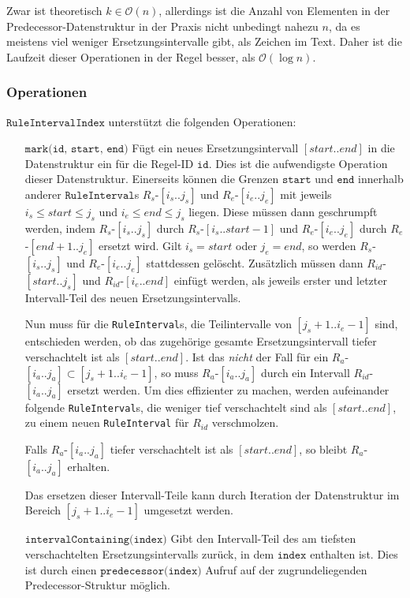 Zwar ist theoretisch $k \in \mathcal{O}(n)$, allerdings ist die Anzahl von Elementen in der Predecessor-Datenstruktur in der Praxis nicht unbedingt nahezu $n$, da es meistens viel weniger Ersetzungsintervalle gibt, als Zeichen im Text. Daher ist die Laufzeit dieser Operationen in der Regel besser, als $\mathcal{O}(\log n)$.

\subsubsection{Operationen}

$\texttt{RuleIntervalIndex}$ unterstützt die folgenden Operationen:

\begin{itemize}[leftmargin=5cm]
	\item[$\texttt{mark(id, start, end)}$] Fügt ein neues Ersetzungsintervall $[start.. end]$ in die Datenstruktur ein für die Regel-ID $\texttt{id}$. Dies ist die aufwendigste Operation dieser Datenstruktur. 
    Einerseits können die Grenzen $\texttt{start}$ und $\texttt{end}$ innerhalb anderer $\texttt{RuleInterval}$s $R_s$-$[i_s..j_s]$ und $R_e$-$[i_e.. j_e]$ mit jeweils $i_s \leq start \leq j_s$ und $i_e \leq end \leq j_s$ liegen. Diese müssen dann geschrumpft werden, indem $R_s$-$[i_s..j_s]$ durch $R_s$-$[i_s..start - 1]$ und $R_e$-$[i_e..j_e]$ durch $R_e$-$[end + 1..j_e]$ ersetzt wird. Gilt $i_s = start$ oder $j_e = end$, so werden $R_s$-$[i_s..j_s]$ und $R_e$-$[i_e.. j_e]$ stattdessen gelöscht.
    Zusätzlich müssen dann $R_{id}$-$[start..j_s]$ und $R_{id}$-$[i_e..end]$ einfügt werden, als jeweils erster und letzter Intervall-Teil des neuen Ersetzungsintervalls.
    
    Nun muss für die \texttt{RuleInterval}s, die Teilintervalle von $[j_s + 1..i_e - 1]$ sind, entschieden werden, ob das zugehörige gesamte Ersetzungsintervall tiefer verschachtelt ist als $[start.. end]$.
    Ist das \emph{nicht} der Fall für ein $R_a$-$[i_a..j_a] \subset [j_s + 1..i_e - 1]$, so muss $R_a$-$[i_a..j_a]$ durch ein Intervall $R_{id}$-$[i_a..j_a]$ ersetzt werden. Um dies effizienter zu machen, werden aufeinander folgende \texttt{RuleInterval}s, die weniger tief verschachtelt sind als $[start.. end]$, zu einem neuen \texttt{RuleInterval} für $R_{id}$ verschmolzen.

    Falls $R_a$-$[i_a..j_a]$ tiefer verschachtelt ist als $[start.. end]$, so bleibt $R_a$-$[i_a..j_a]$ erhalten. 

    Das ersetzen dieser Intervall-Teile kann durch Iteration der Datenstruktur im Bereich $[j_s + 1..i_e - 1]$ umgesetzt werden. 
	\item[$\texttt{intervalContaining(index)}$] Gibt den Intervall-Teil des am tiefsten verschachtelten Ersetzungsintervalls zurück, in dem $\texttt{index}$ enthalten ist. Dies ist durch einen $\texttt{predecessor(index)}$ Aufruf auf der zugrundeliegenden Predecessor-Struktur möglich.
\end{itemize}
